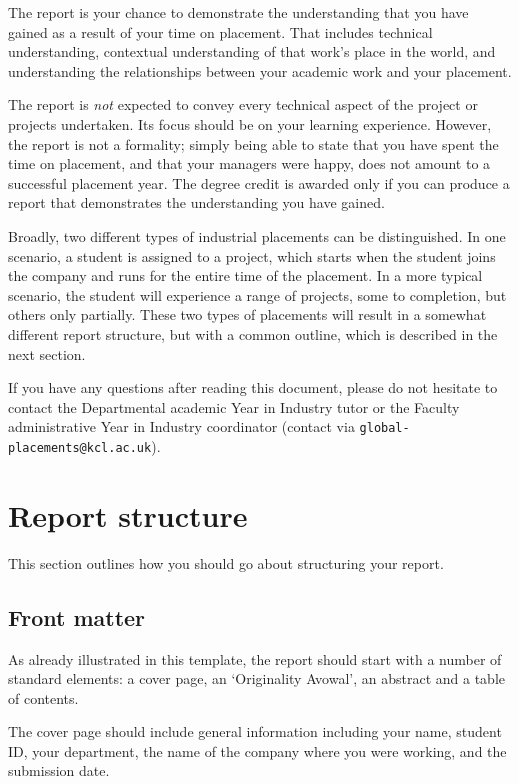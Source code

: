 \documentclass[12pt,a4paper,twoside,openright]{report}
\begin{document}
The report is your chance to demonstrate the understanding that you have gained as a result of your
time on placement. That includes technical understanding, contextual understanding of that work's
place in the world, and understanding the relationships between your academic work and your
placement.

The report is \emph{not} expected to convey every technical aspect of the project or projects undertaken.
Its focus should be on your learning experience. However, the report is not a formality;
simply being able to state that you have spent the time on placement, and that your managers were
happy, does not amount to a successful placement year. The degree credit is awarded only if you can
produce a report that demonstrates the understanding you have gained.

Broadly, two different types of industrial placements can be distinguished. In one scenario, a
student is assigned to a project, which starts when the student joins the company and runs for the
entire time of the placement. In a more typical scenario, the student will experience a range of
projects, some to completion, but others only partially. These two types of placements will result
in a somewhat different report structure, but with a common outline, which is described in the next
section.

\sloppypar{} If you have any questions after reading this document, please do not hesitate to contact the
Departmental academic Year in Industry tutor or the Faculty administrative Year in Industry
coordinator (contact via \texttt{global-placements@kcl.ac.uk}).

\chapter{Report structure}

This section outlines how you should go about structuring your report.

\section{Front matter}

As already illustrated in this template, the report should start with a number of standard elements:
a cover page, an `Originality Avowal', an abstract and a table of contents.

The cover page should include general information including your name, student ID, your department,
the name of the company where you were working, and the submission date.
\end{document}
